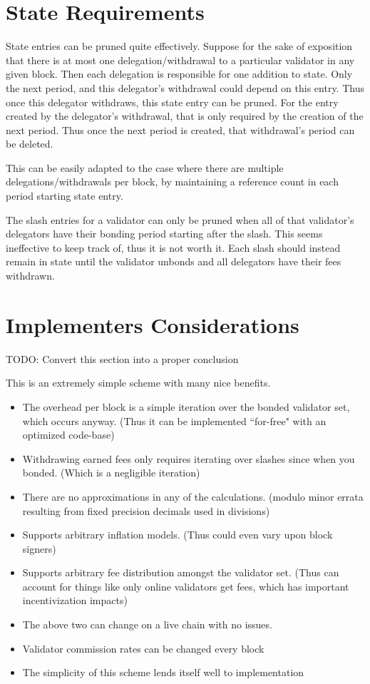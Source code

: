 \documentclass[]{article}
\begin{document}
\section{State Requirements}
State entries can be pruned quite effectively.
Suppose for the sake of exposition that there is at most one delegation/withdrawal to a particular validator in any given block.
Then each delegation is responsible for one addition to state.
Only the next period, and this delegator's withdrawal could depend on this entry. Thus once this delegator withdraws, this state entry can be pruned.
For the entry created by the delegator's withdrawal, that is only required by the creation of the next period.
Thus once the next period is created, that withdrawal's period can be deleted.

This can be easily adapted to the case where there are multiple delegations/withdrawals per block, by maintaining a reference count in each period starting state entry.

The slash entries for a validator can only be pruned when all of that validator's delegators have their bonding period starting after the slash.
This seems ineffective to keep track of, thus it is not worth it.
Each slash should instead remain in state until the validator unbonds and all delegators have their fees withdrawn.

\section{Implementers Considerations}
TODO: Convert this section into a proper conclusion

This is an extremely simple scheme with many nice benefits. 
\begin{itemize}
	\item The overhead per block is a simple iteration over the bonded validator set, which occurs anyway. (Thus it can be implemented ``for-free" with an optimized code-base)
	\item Withdrawing earned fees only requires iterating over slashes since when you bonded. (Which is a negligible iteration)
	\item There are no approximations in any of the calculations. (modulo minor errata resulting from fixed precision decimals used in divisions)
	\item Supports arbitrary inflation models. (Thus could even vary upon block signers)
	\item Supports arbitrary fee distribution amongst the validator set. (Thus can account for things like only online validators get fees, which has important incentivization impacts)
	\item The above two can change on a live chain with no issues.
	\item Validator commission rates can be changed every block
	\item The simplicity of this scheme lends itself well to implementation
\end{itemize}
\end{document}
